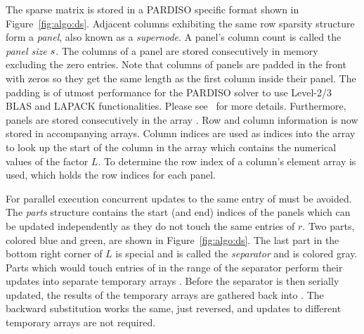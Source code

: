
The sparse matrix is stored in a PARDISO specific format shown in
Figure~\ref{fig:algo:ds}.
Adjacent columns exhibiting the same row sparsity structure form a
\textit{panel}, also known as a \textit{supernode}.
A panel's column count is called the \textit{panel size} $s$.
The columns of a panel are stored consecutively in memory excluding the zero
entries. 
Note that columns of panels are padded in the front with zeros so they get the 
same length as the first column inside their panel. 
The padding is of utmost performance for the PARDISO solver to use Level-2/3
BLAS and LAPACK functionalities. Please see~\cite{Bollhofer2020} for more
details.
Furthermore, panels are stored consecutively in the array \vlnz{}.
Row and column information is now stored in accompanying arrays.
Column indices are used as indices into the array \vxlnz{} to look up the
start of
the column in the array \vlnz{} which contains the numerical values of the factor $L$.
To determine the row index of a column's element array \vindx{} is
used, which holds the row indices for each panel.

For parallel execution concurrent updates to the same entry of \vr{} must be
avoided.
The \textit{parts} structure contains the start (and end) indices of the panels
which can be updated independently as they do not touch the same entries of $r$.
Two parts, colored blue and green, are shown in Figure~\ref{fig:algo:ds}.
The last part in the bottom right corner of $L$ is special and is called the 
\textit{separator} and is colored gray.
%
Parts which would touch entries of \vr{} in the range of the separator perform 
their updates into separate temporary arrays \vtemp{}.
Before the separator is then serially updated, the results of the temporary
arrays are gathered back into \vr{}. 
The backward substitution works the same, just reversed, and
updates to different temporary arrays are not required.

